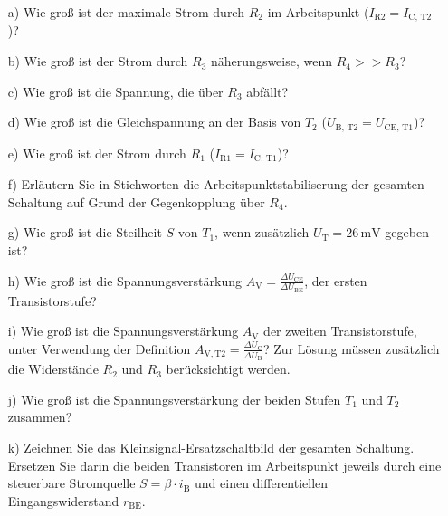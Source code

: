 {  \begin{itemize}
    \item[a)]
          Wie groß ist der maximale Strom durch $R_2$ im Arbeitspunkt ($I_\mathrm{R2}=I_\mathrm{C,\,T2}$)?
    \item[b)]
          Wie groß ist der Strom durch $R_3$ näherungsweise, wenn $R_4 >> R_3$?
    \item[c)]
          Wie groß ist die Spannung, die über $R_3$ abfällt? 
    \item[d)]
          Wie groß ist die Gleichspannung an der Basis von $T_2$ ($U_\mathrm{B,\,T2}=U_\mathrm{CE,\,T1}$)?
    \item[e)]
          Wie groß ist der Strom durch $R_1$ ($I_\mathrm{R1}=I_\mathrm{C,\,T1}$)?
    \item[f)]
          Erläutern Sie in Stichworten die Arbeitspunktstabiliserung der gesamten Schaltung auf Grund der Gegenkopplung über $R_4$.
    \item[g)]
          Wie groß ist die Steilheit $S$ von $T_\mathrm{1}$, wenn zusätzlich $U_\mathrm{T} = 26\, \mathrm{mV}$ gegeben ist?
    \item[h)]
          Wie groß ist die Spannungsverstärkung $A_\mathrm{V} = \frac{\Delta U_\mathrm{CE}}{\Delta U_\mathrm{BE}}$, der ersten Transistorstufe?
    \item[i)]
          Wie groß ist die Spannungsverstärkung $A_\mathrm{V}$ der zweiten Transistorstufe, unter Verwendung der Definition $A_\mathrm{V,T2}=\frac{\Delta U_\mathrm{C}}{\Delta U_\mathrm{B}}$?
          Zur Lösung müssen zusätzlich die Widerstände $R_2$ und $R_3$ berücksichtigt werden.
    \item[j)]
          Wie groß ist die Spannungsverstärkung der beiden Stufen $T_\mathrm{1}$ und $T_\mathrm{2}$ zusammen?
    \item[k)]
          Zeichnen Sie das Kleinsignal-Ersatzschaltbild der gesamten Schaltung. Ersetzen Sie darin die beiden Transistoren im Arbeitspunkt jeweils durch eine steuerbare Stromquelle $S=\beta\cdot i_\mathrm{B}$ und einen differentiellen Eingangswiderstand $r_\mathrm{BE}$.
  \end{itemize}
}



